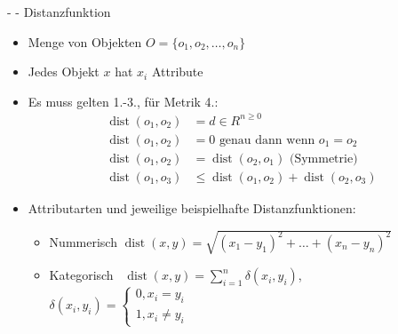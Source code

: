 \documentclass[fleqn,11pt,aspectratio=43]{beamer}
\DeclareMathOperator{\dist}{dist}
\begin{document}
\begin{frame}{\insertsectionhead - \insertsubsectionhead - Distanzfunktion \cite{ester2000knowledge}}
\begin{itemize} %
\item Menge von Objekten $O = \{o_1, o_2, \ldots, o_n\}$
\item Jedes Objekt $x$ hat $x_i$ Attribute
\item Es muss gelten 1.-3., für Metrik 4.:
\begin{align}
\dist(o_1, o_2) &= d \in R^{n\geq 0}\\
\dist(o_1, o_2) &= 0 \mbox{ genau dann wenn } o_1 = o_2\\
\dist(o_1, o_2) &= \dist(o_2, o_1) \mbox{ (Symmetrie)}\\
\dist(o_1, o_3) &\leq \dist(o_1, o_2) + \dist(o_2, o_3)
\end{align}
\item Attributarten und jeweilige beispielhafte Distanzfunktionen:
\begin{itemize}  
\item Nummerisch $\dist(x,y) = \sqrt{(x_1 - y_1)^2 + \ldots + (x_n - y_n)^2}$
\item Kategorisch ~$\dist(x,y) = \sum\limits_{i=1}^{n}\delta(x_i, y_i)$,~~~~~ $\delta(x_i, y_i) = \begin{cases}
0  ,x_i = y_i\\
1  ,x_i \neq y_i
\end{cases} $
\end{itemize}
\end{itemize}
\end{frame}
\end{document}
